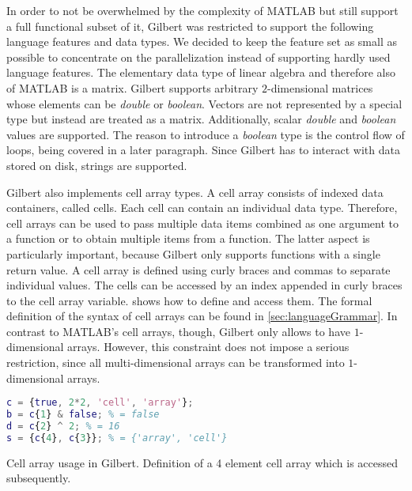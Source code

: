 In order to not be overwhelmed by the complexity of MATLAB but still support a full functional subset of it, Gilbert was restricted to support the following language features and data types.
We decided to keep the feature set as small as possible to concentrate on the parallelization instead of supporting hardly used language features.
The elementary data type of linear algebra and therefore also of MATLAB is a matrix.
Gilbert supports arbitrary $2$-dimensional matrices whose elements can be \emph{double} or \emph{boolean}.
Vectors are not represented by a special type but instead are treated as a matrix.
Additionally, scalar \emph{double} and \emph{boolean} values are supported.
The reason to introduce a \emph{boolean} type is the control flow of loops, being covered in a later paragraph.
Since Gilbert has to interact with data stored on disk, strings are supported.

Gilbert also implements cell array types.
A cell array consists of indexed data containers, called cells.
Each cell can contain an individual data type.
Therefore, cell arrays can be used to pass multiple data items combined as one argument to a function or to obtain multiple items from a function.
The latter aspect is particularly important, because Gilbert only supports functions with a single return value.
A cell array is defined using curly braces and commas to separate individual values.
The cells can be accessed by an index appended in curly braces to the cell array variable.
 shows how to define and access them.
The formal definition of the syntax of cell arrays can be found in \cref{sec:languageGrammar}.
In contrast to MATLAB's cell arrays, though, Gilbert only allows to have $1$-dimensional arrays.
However, this constraint does not impose a serious restriction, since all multi-dimensional arrays can be transformed into $1$-dimensional arrays. 

\begin{listing}[!h]
  \begin{CenteredBox}
    \begin{lstlisting}[language=Matlab,
        commentstyle=\color{black},
        stringstyle=\color{black},
    ]
c = {true, 2*2, 'cell', 'array'};
b = c{1} & false; % = false
d = c{2} ^ 2; % = 16
s = {c{4}, c{3}}; % = {'array', 'cell'} 
    \end{lstlisting}
  \end{CenteredBox}
  \caption{Cell array usage in Gilbert. Definition of a 4 element cell array which is accessed subsequently.}
  \label{lst:cellArray}
\end{listing}

